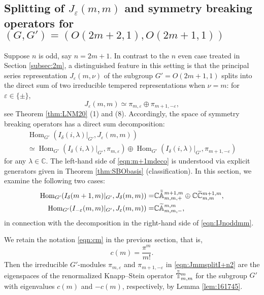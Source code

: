 \subsection{Splitting of $J_{\varepsilon}(m,m)$
 and symmetry breaking operators for 
 $(G,G')=(O(2m+2,1),O(2m+1,1))$}
\label{subsec:2m+1}

Suppose $n$ is odd, 
say $n=2m+1$.  
In contrast to the $n$ even case treated
 in Section \ref{subsec:2m}, 
 a distinguished feature in this setting
 is that the principal series representation
 $J_{\varepsilon}(m,\nu)$ of the subgroup $G' =O(2m+1,1)$
 splits into the direct sum
 of two irreducible 
 tempered representations
 when $\nu=m$: for $\varepsilon\in \{\pm\}$, 
\begin{equation}
\label{eqn:JmmsplitI+n2}
J_{\varepsilon}(m,m) \simeq \pi_{m,\varepsilon} \oplus \pi_{m+1,-\varepsilon}, 
\end{equation}
 see Theorem \ref{thm:LNM20} (1) and (8).  
Accordingly, 
 the space of symmetry breaking operators has a direct sum decomposition:
\begin{multline}
\label{eqn:m+1mdeco}
{\operatorname{Hom}}_{G'}(I_{\delta}(i,\lambda)|_{G'}, J_{\varepsilon}(m, m))
\\
\simeq 
{\operatorname{Hom}}_{G'}(I_{\delta}(i,\lambda)|_{G'}, \pi_{m,\varepsilon})
\oplus 
{\operatorname{Hom}}_{G'}(I_{\delta}(i,\lambda)|_{G'},
 \pi_{m+1,-\varepsilon})
\end{multline}
for any $\lambda \in {\mathbb{C}}$.  
The left-hand side of \eqref{eqn:m+1mdeco} is understood
 via explicit generators
 given in Theorem \ref{thm:SBObasis} (classification).  
In this section,
 we examine the following two cases:
\begin{align}
\label{eqn:IJnoddmm}
{\operatorname{Hom}}_{G'}(I_{\delta}(m+1,m)|_{G'}, J_{\delta}(m, m))
= &
{\mathbb{C}}
\tilde{\tilde{{\mathbb{A}}}}_{{m},{m},{+}}^{{m+1,m}}
\oplus 
{\mathbb{C}}
\widetilde{{\mathbb{C}}}_{{m},{m}}^{{m+1,m}},
\\
\label{eqn:IJnoddmm-}
{\operatorname{Hom}}_{G'}(I_{-\varepsilon}(m,m)|_{G'}, J_{\varepsilon}(m, m))
= &
{\mathbb{C}} {\widetilde{\mathbb{A}}}_{{m},{m},{-}}^{{m,m}}, 
\end{align}
in connection with the decomposition 
 in the right-hand side of \eqref{eqn:IJnoddmm}.  



We retain the notation \eqref{eqn:cm}
 in the previous section,
 that is, 
\[
  c(m) = \frac{\pi^m}{m!}.  
\]
Then the irreducible $G'$-modules 
 $\pi_{m,\varepsilon}$ and $\pi_{m+1,-\varepsilon}$
 in \eqref{eqn:JmmsplitI+n2}
 are the eigenspaces
 of the renormalized Knapp--Stein operator
 $\tilde{\tilde{{\mathbb{T}}}}_{{m},{m}}^{{m}}$ for the subgroup $G'$
 with eigenvalues $c(m)$ and $-c(m)$, 
respectively, 
 by Lemma \ref{lem:161745}.   



